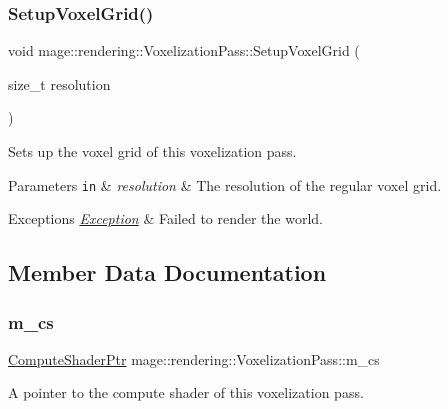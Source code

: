 \subsubsection{\texorpdfstring{Setup\+Voxel\+Grid()}{SetupVoxelGrid()}}
{\footnotesize\ttfamily void mage\+::rendering\+::\+Voxelization\+Pass\+::\+Setup\+Voxel\+Grid (\begin{DoxyParamCaption}\item[{size\+\_\+t}]{resolution }\end{DoxyParamCaption})\hspace{0.3cm}{\ttfamily [private]}}

Sets up the voxel grid of this voxelization pass.


\begin{DoxyParams}[1]{Parameters}
\mbox{\tt in}  & {\em resolution} & The resolution of the regular voxel grid. \\
\hline
\end{DoxyParams}

\begin{DoxyExceptions}{Exceptions}
{\em \hyperlink{classmage_1_1_exception}{Exception}} & Failed to render the world. \\
\hline
\end{DoxyExceptions}


\subsection{Member Data Documentation}
\hypertarget{classmage_1_1rendering_1_1_voxelization_pass_ae3d844f54f0a3c1e2949b8cb38836eeb}{}\label{classmage_1_1rendering_1_1_voxelization_pass_ae3d844f54f0a3c1e2949b8cb38836eeb} 
\subsubsection{\texorpdfstring{m\+\_\+cs}{m\_cs}}
{\footnotesize\ttfamily \hyperlink{namespacemage_1_1rendering_ab3dc9f2114f2e9255b91d9c051da52ea}{Compute\+Shader\+Ptr} mage\+::rendering\+::\+Voxelization\+Pass\+::m\+\_\+cs\hspace{0.3cm}{\ttfamily [private]}}

A pointer to the compute shader of this voxelization pass. \hypertarget{classmage_1_1rendering_1_1_voxelization_pass_a44fc5652aed364651c7f58db658fc951}{}\label{classmage_1_1rendering_1_1_voxelization_pass_a44fc5652aed364651c7f58db658fc951} 
